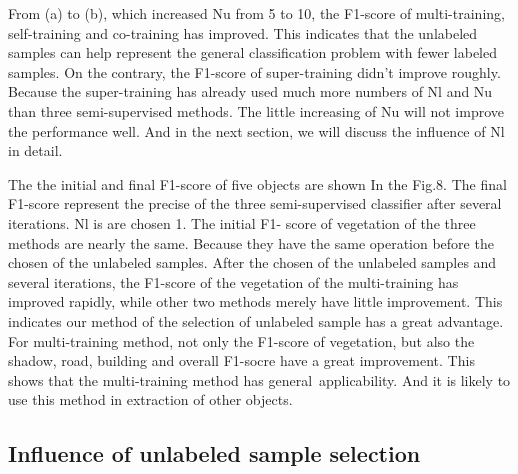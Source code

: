 \documentclass{isprs} %
\begin{document}
From (a) to (b), which increased Nu from 5 to 10, the F1-score of multi-training, self-training and co-training has improved. This indicates that the unlabeled samples can help represent the general classification problem with fewer labeled samples. On the contrary, the F1-score of super-training didn’t improve roughly. Because the super-training has already used much more numbers of Nl and Nu than three semi-supervised methods. The little increasing of Nu will not improve the performance well. And in the next section, we will discuss the influence of Nl in detail.

The the initial and final F1-score of five objects are shown In the Fig.8. The final F1-score represent the precise of the three semi-supervised classifier after several iterations. Nl is are chosen 1. The initial F1- score of vegetation of the three methods are nearly the same. Because they have the same operation before the chosen of the unlabeled samples. After the chosen of the unlabeled samples and several iterations, the F1-score of the vegetation of the multi-training has improved rapidly, while other two methods merely have little improvement. This indicates our method of the selection of unlabeled sample has a great advantage. For multi-training method, not only the F1-score of vegetation, but also the shadow, road, building and overall F1-socre have a great improvement. This shows that the multi-training method has general applicability. And it is likely to use this method in extraction of other objects.

\subsection{Influence of unlabeled sample selection}
\end{document}
